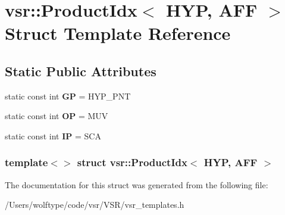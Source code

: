 \hypertarget{structvsr_1_1_product_idx_3_01_h_y_p_00_01_a_f_f_01_4}{\section{vsr\-:\-:Product\-Idx$<$ H\-Y\-P, A\-F\-F $>$ Struct Template Reference}
\label{structvsr_1_1_product_idx_3_01_h_y_p_00_01_a_f_f_01_4}
}
\subsection*{Static Public Attributes}
\begin{DoxyCompactItemize}
\item 
\hypertarget{structvsr_1_1_product_idx_3_01_h_y_p_00_01_a_f_f_01_4_a839dd2ad4914e0ef45d2ae611b2c0dc7}{static const int {\bfseries G\-P} = H\-Y\-P\-\_\-\-P\-N\-T}\label{structvsr_1_1_product_idx_3_01_h_y_p_00_01_a_f_f_01_4_a839dd2ad4914e0ef45d2ae611b2c0dc7}

\item 
\hypertarget{structvsr_1_1_product_idx_3_01_h_y_p_00_01_a_f_f_01_4_acf5248d15ca003bbc7d5560fe3499008}{static const int {\bfseries O\-P} = M\-U\-V}\label{structvsr_1_1_product_idx_3_01_h_y_p_00_01_a_f_f_01_4_acf5248d15ca003bbc7d5560fe3499008}

\item 
\hypertarget{structvsr_1_1_product_idx_3_01_h_y_p_00_01_a_f_f_01_4_a1579b7416cff795006c498f58090eef4}{static const int {\bfseries I\-P} = S\-C\-A}\label{structvsr_1_1_product_idx_3_01_h_y_p_00_01_a_f_f_01_4_a1579b7416cff795006c498f58090eef4}

\end{DoxyCompactItemize}
\subsubsection*{template$<$$>$ struct vsr\-::\-Product\-Idx$<$ H\-Y\-P, A\-F\-F $>$}



The documentation for this struct was generated from the following file\-:\begin{DoxyCompactItemize}
\item 
/\-Users/wolftype/code/vsr/\-V\-S\-R/vsr\-\_\-templates.\-h\end{DoxyCompactItemize}
